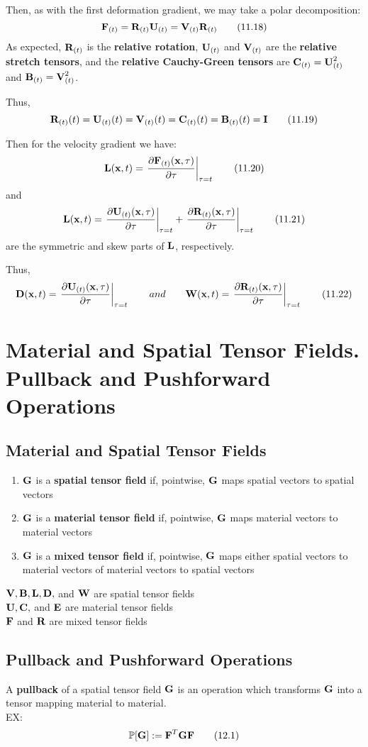\documentclass{article}
\begin{document}
Then, as with the first deformation gradient, we may take a polar decomposition:
\[
	\textbf{F}_{(t)} = \textbf{R}_{(t)}\textbf{U}_{(t)} = \textbf{V}_{(t)}\textbf{R}_{(t)}\tag{11.18}
\]
As expected, $\textbf{R}_{(t)}$ is the \textbf{relative rotation}, $\textbf{U}_{(t)}$ and $\textbf{V}_{(t)}$ are the \textbf{relative stretch tensors}, and the \textbf{relative Cauchy-Green tensors} are $\textbf{C}_{(t)} = \textbf{U}_{(t)}^2$ and $\textbf{B}_{(t)} = \textbf{V}_{(t)}^2$.

Thus,
\[
	\textbf{R}_{(t)}(t) = \textbf{U}_{(t)}(t) = \textbf{V}_{(t)}(t) = \textbf{C}_{(t)}(t) = \textbf{B}_{(t)}(t) = \textbf{I}\tag{11.19}
\]

Then for the velocity gradient we have:
\[
	\textbf{L}(\textbf{x},t) = \left.\frac{\partial {\textbf{F}_{(t)}(\textbf{x},\tau)}}{\partial {\tau}}\right|_{\tau = t}\tag{11.20}
\]
and
\[
	\textbf{L}(\textbf{x},t) = \left.\frac{\partial {\textbf{U}_{(t)}(\textbf{x},\tau)}}{\partial {\tau}}\right|_{\tau = t} + \left.\frac{\partial {\textbf{R}_{(t)}(\textbf{x},\tau)}}{\partial {\tau}}\right|_{\tau = t}\tag{11.21}
\]
are the symmetric and skew parts of $\textbf{L}$, respectively.

Thus,
\[
	\textbf{D}(\textbf{x},t) = \left.\frac{\partial {\textbf{U}_{(t)}(\textbf{x},\tau)}}{\partial {\tau}}\right|_{\tau = t}\qquad and \qquad \textbf{W}(\textbf{x},t) = \left.\frac{\partial {\textbf{R}_{(t)}(\textbf{x},\tau)}}{\partial {\tau}}\right|_{\tau = t}\tag{11.22}
\]

\section{Material and Spatial Tensor Fields. Pullback and Pushforward Operations}
\subsection{Material and Spatial Tensor Fields}
\begin{enumerate}
	\item $\textbf{G}$ is a \textbf{spatial tensor field} if, pointwise, $\textbf{G}$ maps spatial vectors to spatial vectors
	\item $\textbf{G}$ is a \textbf{material tensor field} if, pointwise, $\textbf{G}$ maps material vectors to material vectors
	\item $\textbf{G}$ is a \textbf{mixed tensor field} if, pointwise, $\textbf{G}$ maps either spatial vectors to material vectors of material vectors to spatial vectors
\end{enumerate}

\begin{remark}
	$\textbf{V},\textbf{B},\textbf{L},\textbf{D},$ and $\textbf{W}$ are spatial tensor fields\\
	$\textbf{U},\textbf{C},$ and $\textbf{E}$ are material tensor fields\\
	$\textbf{F}$ and $\textbf{R}$ are mixed tensor fields
\end{remark}
\subsection{Pullback and Pushforward Operations}
A \textbf{pullback} of a spatial tensor field $\textbf{G}$ is an operation which transforms $\textbf{G}$ into a tensor mapping material to material.\\
EX:
\[
\mathbb{P}[\textbf{G}]:=\textbf{F}^T\textbf{G}\textbf{F}\tag{12.1}
\]
\end{document}
